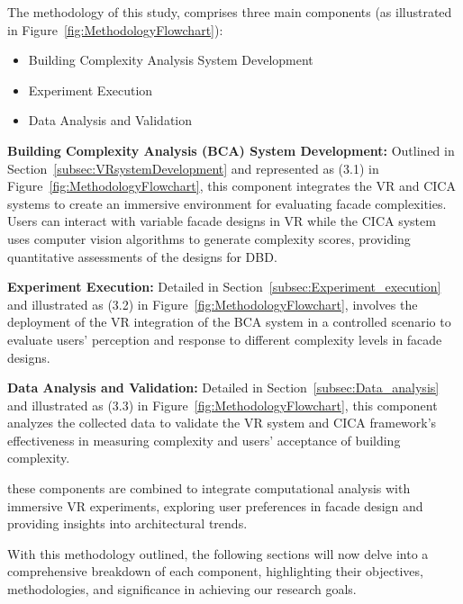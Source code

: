 The methodology of this study, comprises three main components (as illustrated in  Figure~\ref{fig:MethodologyFlowchart}):

\begin{itemize}
    \item Building Complexity Analysis System Development
    \item Experiment Execution
    \item Data Analysis and Validation
\end{itemize}


\textbf{Building Complexity Analysis (BCA) System Development:}  Outlined in Section~\ref{subsec:VRsystemDevelopment} and represented as (3.1) in Figure~\ref{fig:MethodologyFlowchart}, this component integrates the VR and CICA systems to create an immersive environment for evaluating facade complexities.
Users can interact with variable facade designs in VR while the CICA system uses computer vision algorithms to generate complexity scores, providing quantitative assessments of the designs for DBD\@.

\textbf{Experiment Execution:} Detailed in Section~\ref{subsec:Experiment_execution} and illustrated as (3.2) in Figure~\ref{fig:MethodologyFlowchart}, involves the deployment of the VR integration of the BCA system in a controlled scenario to evaluate users' perception and response to different complexity levels in facade designs.

\textbf{Data Analysis and Validation:} Detailed in Section~\ref{subsec:Data_analysis} and illustrated as (3.3) in Figure~\ref{fig:MethodologyFlowchart}, this component analyzes the collected data to validate the VR system and CICA framework's effectiveness in measuring complexity and
users' acceptance of building complexity.


these components are combined to integrate computational analysis with immersive VR experiments, exploring user preferences in facade design and providing insights into architectural trends.

With this methodology outlined, the following sections will now delve into a comprehensive breakdown of each component, highlighting their objectives, methodologies, and significance in achieving our research goals.


